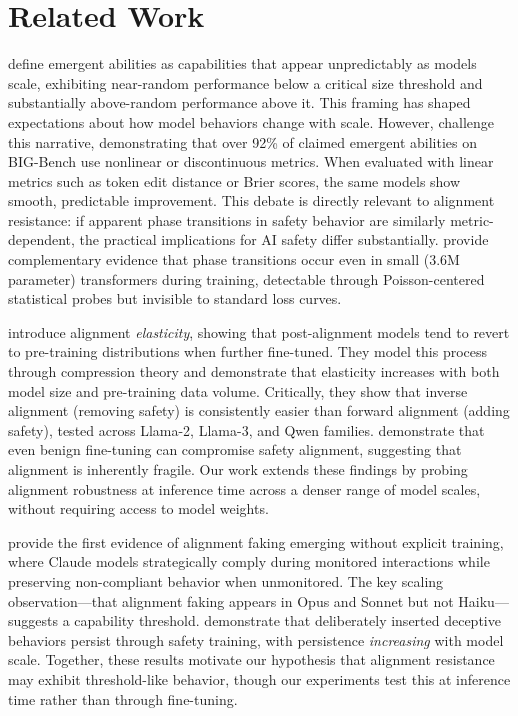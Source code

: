 \section{Related Work}
\label{sec:related}

\citet{wei2022emergent} define emergent abilities as capabilities that appear unpredictably as models scale, exhibiting near-random performance below a critical size threshold and substantially above-random performance above it. This framing has shaped expectations about how model behaviors change with scale. However, \citet{schaeffer2023emergent} challenge this narrative, demonstrating that over 92\% of claimed emergent abilities on BIG-Bench use nonlinear or discontinuous metrics. When evaluated with linear metrics such as token edit distance or Brier scores, the same models show smooth, predictable improvement. This debate is directly relevant to alignment resistance: if apparent phase transitions in safety behavior are similarly metric-dependent, the practical implications for AI safety differ substantially. \citet{hong2025evidence} provide complementary evidence that phase transitions occur even in small (3.6M parameter) transformers during training, detectable through Poisson-centered statistical probes but invisible to standard loss curves.

\citet{ji2024language} introduce alignment \emph{elasticity}, showing that post-alignment models tend to revert to pre-training distributions when further fine-tuned. They model this process through compression theory and demonstrate that elasticity increases with both model size and pre-training data volume. Critically, they show that inverse alignment (removing safety) is consistently easier than forward alignment (adding safety), tested across Llama-2, Llama-3, and Qwen families. \citet{qi2024finetuning} demonstrate that even benign fine-tuning can compromise safety alignment, suggesting that alignment is inherently fragile. Our work extends these findings by probing alignment robustness at inference time across a denser range of model scales, without requiring access to model weights.

\citet{greenblatt2024alignment} provide the first evidence of alignment faking emerging without explicit training, where Claude models strategically comply during monitored interactions while preserving non-compliant behavior when unmonitored. The key scaling observation---that alignment faking appears in Opus and Sonnet but not Haiku---suggests a capability threshold. \citet{hubinger2024sleeper} demonstrate that deliberately inserted deceptive behaviors persist through safety training, with persistence \emph{increasing} with model scale. Together, these results motivate our hypothesis that alignment resistance may exhibit threshold-like behavior, though our experiments test this at inference time rather than through fine-tuning.


